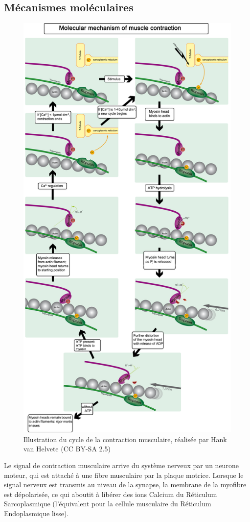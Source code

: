 \documentclass{report}
\begin{document}
\subsection{Mécanismes moléculaires}
\begin{figure}[p]
\includegraphics[scale=0.3]{Figures/Contraction.png}
\caption{Illustration du cycle de la contraction musculaire, réalisée par Hank van Helvete (CC BY-SA 2.5)}
\end{figure}
Le signal de contraction musculaire arrive du système nerveux par un neurone moteur, qui est attaché à une fibre musculaire par la plaque motrice.
Lorsque le signal nerveux est transmis au niveau de la synapse, la membrane de la myofibre est dépolarisée, ce qui aboutit à libérer des ions Calcium du Réticulum Sarcoplasmique (l'équivalent pour la cellule musculaire du Réticulum Endoplasmique lisse). 
\end{document}
